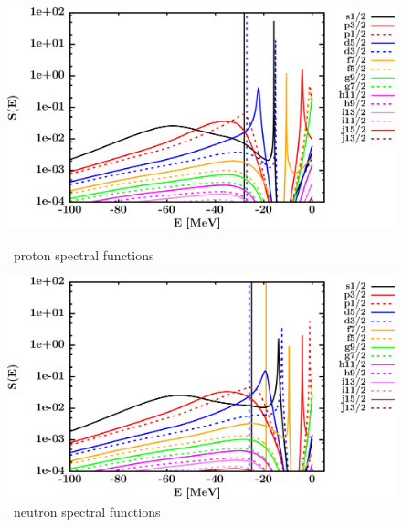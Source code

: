 \begin{figure}[hbtp]
    \centering
    \begin{minipage}{0.42\textwidth}
        \centering
        \includegraphics[width=\textwidth]{figures/ca48_protonSpectralFunctions.png}
        \caption*{\caEight\ proton spectral functions}
        \label{DOMFitData_ca48_proton_spectralFunctions}
    \end{minipage}\hspace{6pt}
    \begin{minipage}{0.42\textwidth}
        \centering
        \includegraphics[width=\linewidth]{figures/ca48_neutronSpectralFunctions.png}
        \caption*{\caEight\ neutron spectral functions}
        \label{DOMFitData_ca48_neutron_spectralFunctions}
    \end{minipage}
\end{figure}
